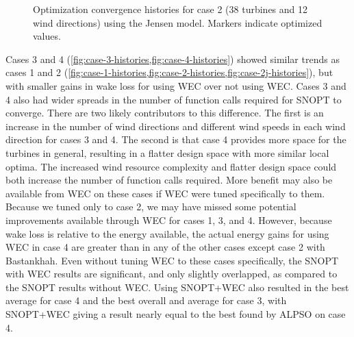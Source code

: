 \documentclass{jpconf}
\begin{document}
\begin{figure}[h!]
\begin{minipage}[t]{0.45\textwidth}
		\caption{Optimization convergence histories for case 2 (38 turbines and 12 wind directions) using the Jensen model. Markers indicate optimized values.}
		\label{fig:case-2j-histories}
	\end{minipage}
\end{figure}

Cases 3 and 4 (\cref{fig:case-3-histories,fig:case-4-histories}) showed similar trends as cases 1 and 2 (\cref{fig:case-1-histories,fig:case-2-histories,fig:case-2j-histories}), but with smaller gains in wake loss for using WEC over not using WEC. Cases 3 and 4 also had wider spreads in the number of function calls required for SNOPT to converge. There are two likely contributors to this difference. The first is an increase in the number of wind directions and different wind speeds in each wind direction for cases 3 and 4. The second is that case 4 provides more space for the turbines in general, resulting in a flatter design space with more similar local optima. The increased wind resource complexity and flatter design space could both increase the number of function calls required. More benefit may also be available from WEC on these cases if WEC were tuned specifically to them. Because we tuned only to case 2, we may have missed some potential improvements available through WEC for cases 1, 3, and 4. However, because wake loss is relative to the energy available, the actual energy gains for using WEC in case 4 are greater than in any of the other cases except case 2 with Bastankhah.  Even without tuning WEC to these cases specifically, the SNOPT with WEC results are significant, and only slightly overlapped, as compared to the SNOPT results without WEC. Using SNOPT+WEC also resulted in the best average for case 4 and the best overall and average for case 3, with SNOPT+WEC giving a result nearly equal to the best found by ALPSO on case 4.
\end{document}
